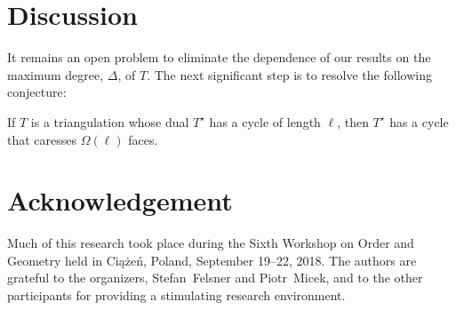 \documentclass{patmorin}
\newcommand{\dual}[1]{{#1}^\star}
\newcommand{\note}[2]{{\color{red}[#1:~#2]}}
\begin{document}


\section{Discussion}


It remains an open problem to eliminate the dependence of our results
on the maximum degree, $\Delta$, of $T$.  The next significant step
is to resolve the following conjecture:

\begin{conj}
  If $T$ is a triangulation whose dual $\dual{T}$ has a cycle of length
  $\ell$, then $\dual{T}$ has a cycle that caresses $\Omega(\ell)$ faces.
\end{conj}


\section*{Acknowledgement}

Much of this research took place during the Sixth Workshop on Order and
Geometry held in Ciążeń, Poland, September 19--22, 2018.  The authors
are grateful to the organizers, Stefan~Felsner and Piotr~Micek, and to
the other participants for providing a stimulating research environment.




\end{document}
